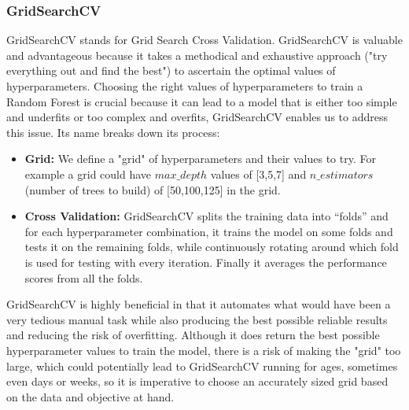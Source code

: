 	\subsubsection{GridSearchCV}
	GridSearchCV stands for Grid Search Cross Validation. GridSearchCV is valuable and advantageous because it takes a methodical and exhaustive approach ("try everything out and find the best") to ascertain the optimal values of hyperparameters. Choosing the right values of hyperparameters to train a Random Forest is crucial because it can lead to a model that is either too simple and underfits or too complex and overfits, GridSearchCV enables us to address this issue. Its name breaks down its process:
	\begin{itemize}
		\item \textbf{Grid:} We define a "grid" of hyperparameters and their values to try. For example a grid could have $max\_depth$ values of [3,5,7] and $n\_estimators$ (number of trees to build) of [50,100,125] in the grid.
		\item \textbf{Cross Validation:} GridSearchCV splits the training data into ``folds'' and for each hyperparameter combination, it trains the model on some folds and tests it on the remaining folds, while continuously rotating around which fold is used for testing with every iteration. Finally it averages the performance scores from all the folds. 
	\end{itemize}

	GridSearchCV is highly beneficial in that it automates what would have been a very tedious manual task while also producing the best possible reliable results and reducing the risk of overfitting. Although it does return the best possible hyperparameter values to train the model, there is a risk of making the "grid" too large, which could potentially lead to GridSearchCV running for ages, sometimes even days or  weeks, so it is imperative to choose an accurately sized grid based on the data and objective at hand.



